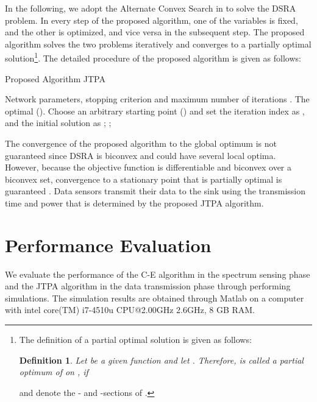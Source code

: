 \documentclass[journal]{IEEEtran} \ifCLASSINFOpdf
\newtheorem{defn}{Definition}\newtheorem{theorem}{Theorem}\newtheorem{prop}{Proposition}
\begin{document}
In the following, we adopt the Alternate Convex Search in \cite{Gorski2007} to solve the DSRA problem. In every step of the proposed algorithm, one of the variables is fixed, and the other is optimized, and vice versa in the subsequent step. The proposed algorithm solves the two problems iteratively and converges to a partially optimal solution\footnote{The definition of a partial optimal solution is given as follows:
\begin{defn}
\label{def_paropt}
Let  be a given function and let . Therefore,  is called a partial optimum of  on , if

\end{defn}  and  denote the - and -sections of  \cite{Gorski2007}.}. The detailed procedure of the proposed algorithm is given as follows:
\begin{algorithm}[h]
\caption{Proposed Algorithm JTPA}
\label{alg_acs}
\begin{algorithmic}[1]
\REQUIRE Network parameters, stopping criterion  and maximum number of  iterations .
\ENSURE The optimal ().
\STATE Choose an arbitrary starting point () and set the iteration index as , and the initial solution as ;
\REPEAT {}
\STATE {};
\RETURN 
\end{algorithmic}
\end{algorithm}

The convergence of the proposed algorithm to the global optimum is not guaranteed since DSRA is biconvex and could have several local optima. However, because the objective function is differentiable and biconvex over a biconvex set, convergence to a stationary point that is partially optimal is guaranteed \cite{Gorski2007}. Data sensors transmit their data to the sink using the transmission time and power that is determined by the proposed JTPA algorithm.
\section{Performance Evaluation} \label{sec:evaluation}
We evaluate the performance of the C-E algorithm in the spectrum sensing phase and the JTPA algorithm in the data transmission phase through performing simulations. The simulation results are obtained through Matlab on a computer with intel core(TM) i7-4510u CPU@2.00GHz 2.6GHz, 8 GB RAM.
\end{document}
